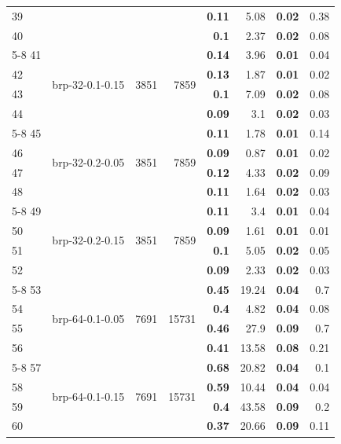 \begin{longtable}{lrr@{\hskip 12pt}r@{\hskip 12pt}r@{\hskip 12pt}r@{\hskip 12pt}r@{\hskip 12pt}r}
39 &  &  &  & \textbf{0.11} & 5.08 & \textbf{0.02} & 0.38 \\
40 &  &  &  & \textbf{0.1} & 2.37 & \textbf{0.02} & 0.08 \\
\cmidrule{5-8}
41 & \multirow{4}{*}{brp-32-0.1-0.15} & \multirow{4}{*}{3851} & \multirow{4}{*}{7859} & \textbf{0.14} & 3.96 & \textbf{0.01} & 0.04 \\
42 &  &  &  & \textbf{0.13} & 1.87 & \textbf{0.01} & 0.02 \\
43 &  &  &  & \textbf{0.1} & 7.09 & \textbf{0.02} & 0.08 \\
44 &  &  &  & \textbf{0.09} & 3.1 & \textbf{0.02} & 0.03 \\
\cmidrule{5-8}
45 & \multirow{4}{*}{brp-32-0.2-0.05} & \multirow{4}{*}{3851} & \multirow{4}{*}{7859} & \textbf{0.11} & 1.78 & \textbf{0.01} & 0.14 \\
46 &  &  &  & \textbf{0.09} & 0.87 & \textbf{0.01} & 0.02 \\
47 &  &  &  & \textbf{0.12} & 4.33 & \textbf{0.02} & 0.09 \\
48 &  &  &  & \textbf{0.11} & 1.64 & \textbf{0.02} & 0.03 \\
\cmidrule{5-8}
49 & \multirow{4}{*}{brp-32-0.2-0.15} & \multirow{4}{*}{3851} & \multirow{4}{*}{7859} & \textbf{0.11} & 3.4 & \textbf{0.01} & 0.04 \\
50 &  &  &  & \textbf{0.09} & 1.61 & \textbf{0.01} & 0.01 \\
51 &  &  &  & \textbf{0.1} & 5.05 & \textbf{0.02} & 0.05 \\
52 &  &  &  & \textbf{0.09} & 2.33 & \textbf{0.02} & 0.03 \\
\cmidrule{5-8}
53 & \multirow{4}{*}{brp-64-0.1-0.05} & \multirow{4}{*}{7691} & \multirow{4}{*}{15731} & \textbf{0.45} & 19.24 & \textbf{0.04} & 0.7 \\
54 &  &  &  & \textbf{0.4} & 4.82 & \textbf{0.04} & 0.08 \\
55 &  &  &  & \textbf{0.46} & 27.9 & \textbf{0.09} & 0.7 \\
56 &  &  &  & \textbf{0.41} & 13.58 & \textbf{0.08} & 0.21 \\
\cmidrule{5-8}
57 & \multirow{4}{*}{brp-64-0.1-0.15} & \multirow{4}{*}{7691} & \multirow{4}{*}{15731} & \textbf{0.68} & 20.82 & \textbf{0.04} & 0.1 \\
58 &  &  &  & \textbf{0.59} & 10.44 & \textbf{0.04} & 0.04 \\
59 &  &  &  & \textbf{0.4} & 43.58 & \textbf{0.09} & 0.2 \\
60 &  &  &  & \textbf{0.37} & 20.66 & \textbf{0.09} & 0.11 \\

\end{longtable}
